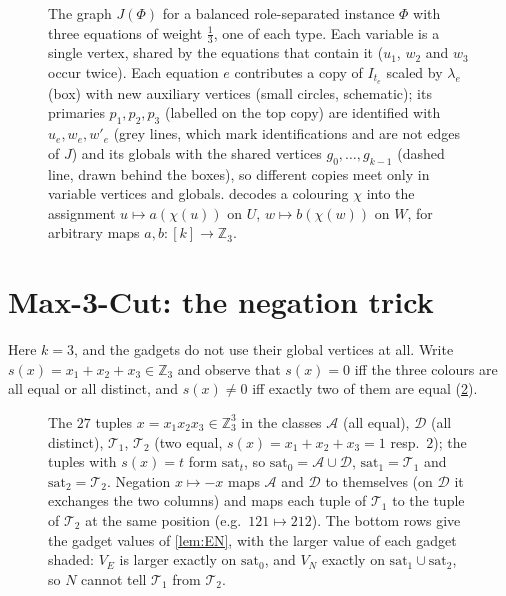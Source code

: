 \documentclass[11pt,letterpaper]{article}
\theoremstyle{remark}
\newcommand{\Z}{\mathbb{Z}}
\newcommand{\sat}{\mathrm{sat}}
\begin{document}
\begin{figure}[t]
\centering

\caption{The graph $J(\Phi)$ for a balanced role-separated instance $\Phi$ with three equations of
weight $\frac13$, one of each type. Each variable is a single vertex, shared by the equations that contain
it ($u_1$, $w_2$ and $w_3$ occur twice). Each equation $e$ contributes a copy of $I_{t_e}$ scaled by
$\lambda_e$ (box) with new auxiliary vertices (small circles, schematic); its primaries $p_1,p_2,p_3$
(labelled on the top copy) are identified with $u_e,w_e,w'_e$ (grey lines, which mark identifications and are not edges of $J$) and its globals with the shared vertices
$g_0,\dots,g_{k-1}$ (dashed line, drawn behind the boxes), so different copies meet only in variable
vertices and globals.  decodes a colouring $\chi$ into the assignment $u\mapsto a(\chi(u))$ on
$U$, $w\mapsto b(\chi(w))$ on $W$, for arbitrary maps $a,b\colon[k]\to\Z_3$.}
\label{fig:reduction}
\end{figure}


\section{Max-3-Cut: the negation trick}\label{sec:three}

Here $k=3$, and the gadgets do not use their global vertices at all. Write $s(x)=x_1+x_2+x_3\in\Z_3$
and observe that $s(x)=0$ iff the three colours are all equal or all distinct, and $s(x)\neq 0$ iff
exactly two of them are equal (\cref{fig:tuples}).

\begin{figure}[t]
\centering

\caption{The $27$ tuples $x=x_1x_2x_3\in\Z_3^3$ in the classes $\mathcal A$ (all equal), $\mathcal D$
(all distinct), $\mathcal T_1$, $\mathcal T_2$ (two equal, $s(x)=x_1+x_2+x_3=1$ resp.\ $2$); the tuples with $s(x)=t$ form $\sat_t$, so
$\sat_0=\mathcal A\cup\mathcal D$, $\sat_1=\mathcal T_1$ and $\sat_2=\mathcal T_2$. Negation $x\mapsto-x$
maps $\mathcal A$ and $\mathcal D$ to themselves (on $\mathcal D$ it exchanges the two columns) and maps
each tuple of $\mathcal T_1$ to the tuple of $\mathcal T_2$ at the same position (e.g.\ $121\mapsto212$).
The bottom rows give the gadget values of \cref{lem:EN}, with the larger value of each gadget shaded:
$V_E$ is larger exactly on $\sat_0$, and $V_N$ exactly on $\sat_1\cup\sat_2$, so $N$ cannot tell
$\mathcal T_1$ from $\mathcal T_2$.}
\label{fig:tuples}
\end{figure}
\end{document}
